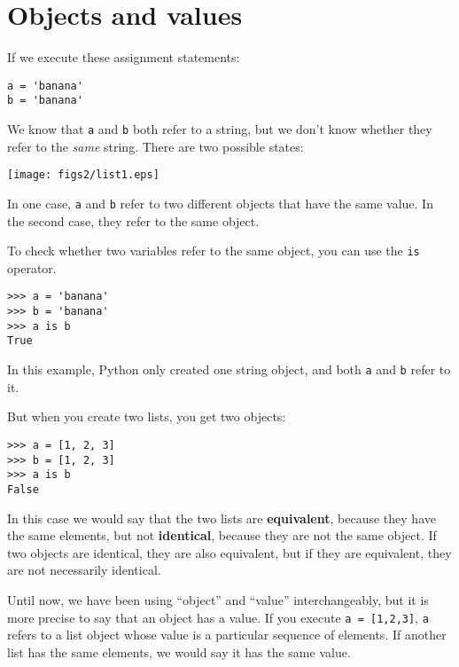 \section{Objects and values}


If we execute these assignment statements:

\beforeverb
\begin{verbatim}
a = 'banana'
b = 'banana'
\end{verbatim}
\afterverb
%
We know that {\tt a} and {\tt b} both refer to a
string, but we don't
know whether they refer to the \emph{same} string.
There are two possible states:


\beforefig
\centerline{\texttt{[image: figs2/list1.eps]}}
\afterfig

In one case, {\tt a} and {\tt b} refer to two different objects that
have the same value.  In the second case, they refer to the same
object.


To check whether two variables refer to the same object, you can
use the {\tt is} operator.

\beforeverb
\begin{verbatim}
>>> a = 'banana'
>>> b = 'banana'
>>> a is b
True
\end{verbatim}
\afterverb
%
In this example, Python only created one string object,
and both {\tt a} and {\tt b} refer to it.

But when you create two lists, you get two objects:

\beforeverb
\begin{verbatim}
>>> a = [1, 2, 3]
>>> b = [1, 2, 3]
>>> a is b
False
\end{verbatim}
\afterverb
%

In this case we would say that the two lists are {\bf equivalent},
because they have the same elements, but not {\bf identical}, because
they are not the same object.  If two objects are identical, they are
also equivalent, but if they are equivalent, they are not necessarily
identical.


Until now, we have been using ``object'' and ``value''
interchangeably, but it is more precise to say that an object has a
value.  If you execute {\tt a = [1,2,3]}, {\tt a} refers to a list
object whose value is a particular sequence of elements.  If another
list has the same elements, we would say it has the same value.


